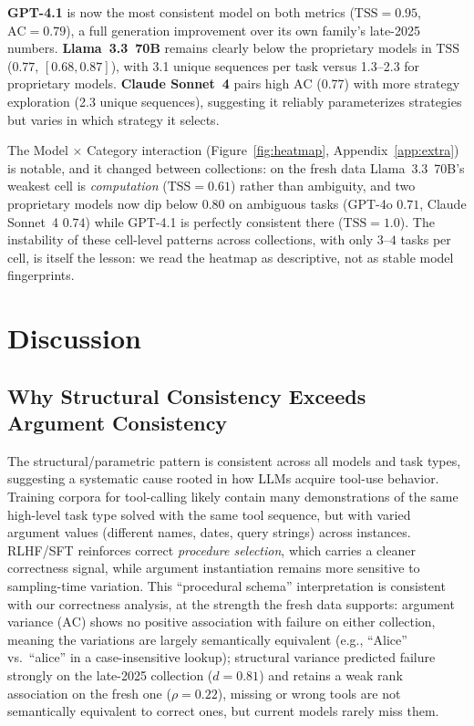 \documentclass[11pt]{article}
\newcommand{\tss}{\mathrm{TSS}}
\newcommand{\ac}{\mathrm{AC}}
\begin{document}
\textbf{GPT-4.1} is now the most consistent model on both metrics ($\tss =
0.95$, $\ac = 0.79$), a full generation improvement over its own family's
late-2025 numbers. \textbf{Llama~3.3~70B} remains clearly below the
proprietary models in $\tss$ ($0.77$, $[0.68, 0.87]$), with 3.1 unique
sequences per task versus 1.3--2.3 for proprietary models. \textbf{Claude
Sonnet~4} pairs high $\ac$ (0.77) with more strategy exploration (2.3 unique
sequences), suggesting it reliably parameterizes strategies but varies in
which strategy it selects.

The Model $\times$ Category interaction (Figure~\ref{fig:heatmap},
Appendix~\ref{app:extra}) is notable,
and it changed between collections: on the fresh data Llama~3.3~70B's weakest
cell is \emph{computation} ($\tss = 0.61$) rather than ambiguity, and two
proprietary models now dip below $0.80$ on ambiguous tasks (GPT-4o $0.71$,
Claude Sonnet~4 $0.74$) while GPT-4.1 is perfectly consistent there
($\tss = 1.0$). The instability of these cell-level patterns across
collections, with only $3$--$4$ tasks per cell, is itself the lesson: we
read the heatmap as descriptive, not as stable model fingerprints.

\section{Discussion}

\subsection{Why Structural Consistency Exceeds Argument Consistency}
\label{sec:why}

The structural/parametric pattern is consistent across all models and task types,
suggesting a systematic cause rooted in how LLMs acquire tool-use behavior.
Training corpora for tool-calling likely contain many demonstrations of the same
high-level task type solved with the same tool sequence, but with varied argument
values (different names, dates, query strings) across instances. RLHF/SFT
reinforces correct \emph{procedure selection}, which carries a cleaner correctness
signal, while argument instantiation remains more sensitive to sampling-time
variation. This ``procedural schema'' interpretation is consistent with our correctness
analysis, at the strength the fresh data supports: argument variance ($\ac$)
shows no positive association with failure on either collection, meaning the
variations are largely semantically equivalent (e.g., ``Alice'' vs.\
``alice'' in a case-insensitive lookup); structural variance predicted failure
strongly on the late-2025 collection ($d = 0.81$) and retains a weak rank
association on the fresh one ($\rho = 0.22$), missing or wrong tools are
not semantically equivalent to correct ones, but current models rarely miss
them.
\end{document}
